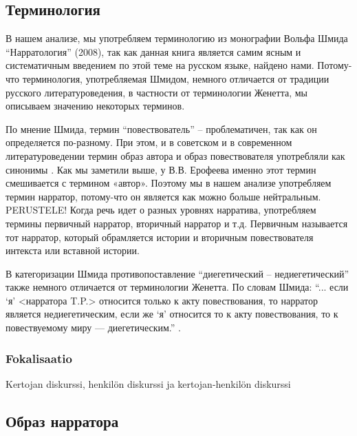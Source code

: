 \documentclass[12pt,a4paper]{article}
\begin{document}
\subsection{Терминология}

В нашем анализе, мы употребляем терминологию из монографии Вольфа Шмида \enquote{Нарратология} (2008), так как данная книга является самим ясным и систематичным введением по этой теме на русском языке, найдено нами. Потому-что терминология, употребляемая Шмидом, немного отличается от традиции русского литературоведения, в частности от терминологии Женетта, мы описываем значению некоторых терминов.
  
По мнение Шмида, термин \enquote{повествователь} -- проблематичен, так как он
определяется по-разному. При этом, и в советском и в современном
литературоведении термин образ автора и образ повествователя употребляли как
синонимы \parencite[67--68]{schmid2008}.  Как мы заметили выше, у В.В.
Ерофеева именно этот термин смешивается с термином «автор». Поэтому мы в нашем анализе
употребляем термин нарратор, потому-что он является как можно больше
нейтральным. PERUSTELE! Когда речь идет о разных уровнях нарратива, употребляем термины
первичный нарратор, вторичный нарратор и т.д. Первичным называется тот нарратор,
который  обрамляется истории и вторичным повествователя интекста или вставной истории.

В категоризации Шмида противопоставление \enquote{диегетический -- недиегетический} также немного отличается от терминологии Женетта. По словам Шмида: \enquote{... если \enquote{я} <нарратора T.P.> относится только к акту повествования, то нарратор является недиегетическим, если же \enquote{я} относится то к акту повествования, то к повествуемому миру — диегетическим.} \parencite[84]{schmid2008}.

\subsubsection{Fokalisaatio}
Kertojan diskurssi, henkilön diskurssi ja kertojan-henkilön diskurssi

\subsection{Образ нарратора}
\end{document}
